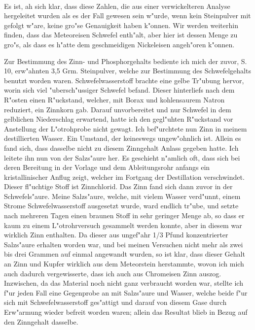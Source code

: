 \documentclass[a4paper, 11pt, oneside]{article}
\begin{document}
\paragraph{}
Es ist, ah sich klar, dass diese Zahlen, die aus einer verwickelteren Analyse hergeleitet wurden als es der Fall gewesen sein w"urde, wenn kein Steinpulver mit gefolgt w"are, keine gro"se Genauigkeit haben k"onnen. Wir werden weiterhin finden, dass das Meteoreisen Schwefel enth"alt, aber hier ist dessen Menge zu gro"s, als dass es h"atte dem geschmeidigen Nickeleisen angeh"oren k"onnen.

Zur Bestimmung des Zinn- und Phosphorgehalts bediente ich mich der zuvor, S. 10, erw"ahnten 3,5 Grm. Steinpulver, welche zur Bestimmung des Schwefelgehalts benutzt worden waren. Schwefelwasserstoff brachte eine gelbe Tr"ubung hervor, worin sich viel "ubersch"ussiger Schwefel befand. Dieser hinterliefs nach dem R"osten einen R"uckstand, welcher, mit Borax und kohlensaurem Natron reduziert, ein Zinnkorn gab. Darauf unvorbereitet und nur Schwefel in dem gelblichen Niederschlag erwartend, hatte ich den gegl"uhten R"uckstand vor Anstellung der L"otrohprobe nicht gewagt. Ich bef"urchtete nun Zinn in meinem destillierten Wasser. Ein Umstand, der keineswegs ungew"ohnlich ist. Allein es fand sich, dass dasselbe nicht zu diesem Zinngehalt Anlass gegeben hatte. Ich leitete ihn nun von der Salzs"aure her. Es geschieht n"amlich oft, dass sich bei deren Bereitung in der Vorlage und dem Ableitungsrohr anfangs ein kristallinischer Anflug zeigt, welcher im Fortgang der Destillation verschwindet. Dieser fl"uchtige Stoff ist Zinnchlorid. Das Zinn fand sich dann zuvor in der Schwefels"aure. Meine Salzs"aure, welche, mit vielem Wasser verd"unnt, einem Strome Schwefelwasserstoff ausgesetzt wurde, ward endlich tr"ube, und setzte nach mehreren Tagen einen braunen Stoff in sehr geringer Menge ab, so dass er kaum zu einem L"otrohrversuch gesammelt werden konnte, aber in diesem war wirklich Zinn enthalten. Da dieser aus ungef"ahr 1/3 Pfund konzentrierter Salzs"aure erhalten worden war, und bei meinen Versuchen nicht mehr als zwei bis drei Grammen auf einmal angewandt wurden, so ist klar, dass dieser Gehalt an Zinn und Kupfer wirklich aus dem Meteorstein herstammte, wovon ich mich auch dadurch vergewisserte, dass ich auch aus Chromeisen Zinn auszog. Inzwischen, da das Material noch nicht ganz verbraucht worden war, stellte ich f"ur jeden Fall eine Gegenprobe an mit Salzs"aure und Wasser, welche beide f"ur sich mit Schwefelwasserstoff ges"attigt und darauf von diesem Gase durch Erw"armung wieder befreit worden waren; allein das Resultat blieb in Bezug auf den Zinngehalt dasselbe.
\end{document}
